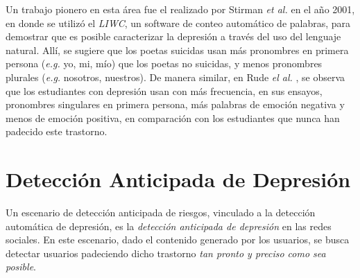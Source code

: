 Un trabajo pionero en esta área fue el realizado por Stirman \emph{et al.} \cite{stirman2001word} en el año 2001, en donde se utilizó el \emph{\ac{LIWC}}, un software de conteo automático de palabras, para demostrar que es posible caracterizar la depresión a través del uso del lenguaje natural.
Allí, se sugiere que los poetas suicidas usan más pronombres en primera persona (\emph{e.g.} yo, mi, mío) que los poetas no suicidas, y menos pronombres plurales (\emph{e.g.} nosotros, nuestros).
De manera similar, en Rude \emph{el al.} \cite{rude2004language}, se observa que los estudiantes con depresión usan con más frecuencia, en sus ensayos, pronombres singulares en primera persona, más palabras de emoción negativa y menos de emoción positiva, en comparación con los estudiantes que nunca han padecido este trastorno.


\section{Detección Anticipada de Depresión}
\label{sec:ADD}

Un escenario de detección anticipada de riesgos, vinculado a la detección automática de depresión, es la \emph{detección anticipada de depresión} en las redes sociales. En este escenario, dado el contenido generado por los usuarios, se busca detectar usuarios padeciendo dicho trastorno \emph{tan pronto y preciso como sea posible}.


